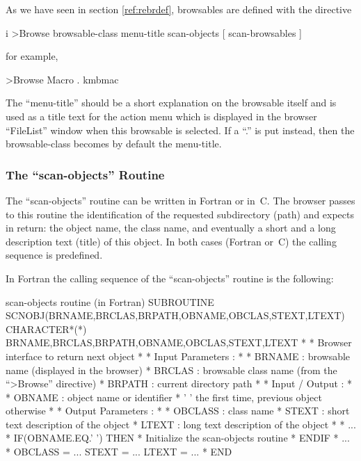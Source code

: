 As we have seen in section \ref{ref:rebrdef}, browsables are defined with the 
\CDF{} directive
\begin{Gray}{i}
>Browse  browsable-class  menu-title  scan-objects  [ scan-browsables ]
\end{Gray}
for example,
\begin{XMP}
>Browse Macro . kmbmac%
\end{XMP}

The ``menu-title'' should be a short explanation on the browsable itself
and is used as a title text for the action menu which is displayed
in the browser ``FileList'' window when this browsable is selected. If a 
``.'' is put instead, then the browsable-class becomes by default the 
menu-title.

\subsubsection{The ``scan-objects'' Routine}
\label{ref:recdfsco}

The ``scan-objects'' routine can be written in Fortran or in~C. 
The browser passes to this routine the identification of the requested 
subdirectory (path) and expects in return: the object name, the class 
name, and eventually a short and a long description text (title) of this 
object. In both cases (Fortran or~C) the calling sequence is predefined. 

In Fortran the calling sequence of the ``scan-objects'' routine 
is the following:
\condbreak{3cm}
\begin{XMPt}{scan-objects routine (in Fortran)}\footnotesize
      SUBROUTINE SCNOBJ(BRNAME,BRCLAS,BRPATH,OBNAME,OBCLAS,STEXT,LTEXT)
      CHARACTER*(*) BRNAME,BRCLAS,BRPATH,OBNAME,OBCLAS,STEXT,LTEXT
*
*            Browser interface to return next object
*
*            Input Parameters  :
*
*                      BRNAME  : browsable name (displayed in the browser)
*                      BRCLAS  : browsable class name (from the ``>Browse'' directive)
*                      BRPATH  : current directory path
*
*            Input / Output    :
*
*                      OBNAME  : object name or identifier
*                                ' ' the first time, previous object otherwise
*
*            Output Parameters :
*
*                      OBCLASS : class name                
*                      STEXT   : short text description of the object
*                      LTEXT   : long text description of the object
*
*     ...
*     IF(OBNAME.EQ.' ') THEN
*        Initialize the scan-objects routine        
*     ENDIF
*     ...
*
      OBCLASS = ...
      STEXT = ...
      LTEXT = ...
*
      END
\end{XMPt}

